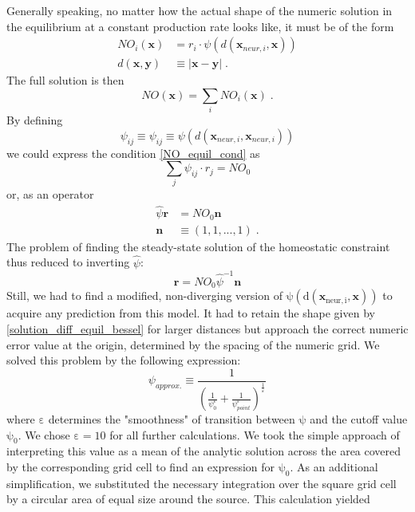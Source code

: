 \documentclass[10pt,a4paper]{article}
\begin{document}
Generally speaking, no matter how the actual shape of the numeric solution in the equilibrium at a constant production rate looks like, it must be of the form
\begin{align}
NO_i(\mathbf{x}) &= r_i \cdot \psi (d(\mathbf{x}_{neur,i},\mathbf{x})) \label{general_diff_interaction} \\
d(\mathbf{x},\mathbf{y}) &\equiv |\mathbf{x}-\mathbf{y}| \; . \label{eucl_dist}
\end{align}
The full solution is then
\begin{equation}
NO(\mathbf{x}) = \sum_i NO_i(\mathbf{x})\;.
\label{full_sol_diff_equil}
\end{equation}
By defining
\begin{equation}
\psi_{ij} \equiv \psi_{ij} \equiv \psi (d(\mathbf{x}_{neur,i},\mathbf{x}_{neur,i}))
\label{interact_matrix_elements}
\end{equation}
we could express the condition \eqref{NO_equil_cond} as
\begin{equation}
\sum_j \psi_{ij}\cdot r_j = NO_0
\label{NO_equil_cond_interact_matrix}
\end{equation}
or, as an operator
\begin{align}
\hat{\psi}\mathbf{r} &= NO_0 \mathbf{n} \label{NO_equil_cond_interact_matrix_operator} \\
\mathbf{n}&\equiv (1,1,...,1) \; .
\end{align}
The problem of finding the steady-state solution of the homeostatic constraint thus reduced to inverting $\hat{\psi}$:
\begin{equation}
\mathbf{r} = NO_0 \hat{\psi}^{-1} \mathbf{n}
\label{NO_euqil_cond_interact_matrix_operator_solve}
\end{equation}
Still, we had to find a modified, non-diverging version of $\mathrm{\psi (d(\mathbf{x}_{neur,i},\mathbf{x}))}$ to acquire any prediction from this model. It had to retain the shape given by \eqref{solution_diff_equil_bessel} for larger distances but approach the correct numeric error value at the origin, determined by the spacing of the numeric grid. We solved this problem by the following expression:
\begin{equation}
\psi_{approx.} \equiv \frac{1}{\left(\frac{1}{\psi_0^\varepsilon} + \frac{1}{\psi_{point}^\varepsilon}\right)^{\frac{1}{\varepsilon}}}
\label{Numeric_Solution_Expression_Trick}
\end{equation}
where $\mathrm{\varepsilon}$ determines the "smoothness" of transition between $\mathrm{\psi}$ and the cutoff value $\mathrm{\psi_0}$. We chose $\mathrm{\varepsilon=10}$ for all further calculations. We took the simple approach of interpreting this value as a mean of the analytic solution across the area covered by the corresponding grid cell to find an expression for $\mathrm{\psi_0}$. As an additional simplification, we substituted the necessary integration over the square grid cell by a circular area of equal size around the source. This calculation yielded
\end{document}
